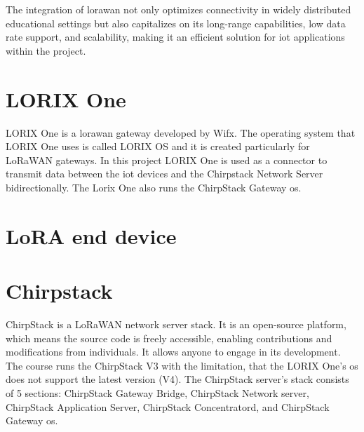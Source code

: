 The integration of \gls{lorawan} not only optimizes connectivity in widely distributed educational settings but also capitalizes on its long-range capabilities, low data rate support, and scalability, making it an efficient solution for \gls{iot} applications within the project.
\cite{lora-developer-portal:about}

\section{LORIX One}
LORIX One is a \gls{lorawan} gateway developed by Wifx\cite{wifx:lorixone}.
The operating system that LORIX One uses is called LORIX OS and it is created particularly for LoRaWAN gateways.
In this project LORIX One is used as a connector to transmit data between the \gls{iot} devices and the Chirpstack Network Server bidirectionally.
The Lorix One also runs the ChirpStack Gateway \gls{os}.

\section{LoRA end device}



\section{Chirpstack}
ChirpStack is a LoRaWAN network server stack.
It is an open-source platform, which means the source code is freely accessible, enabling contributions and modifications from individuals. It allows anyone to engage in its development.
The course runs the ChirpStack V3 with the limitation, that the LORIX One's \gls{os} does not support the latest version (V4).
The ChirpStack server's stack consists of 5 sections: ChirpStack Gateway Bridge, ChirpStack Network server, ChirpStack Application Server, ChirpStack Concentratord, and ChirpStack Gateway \gls{os}.

